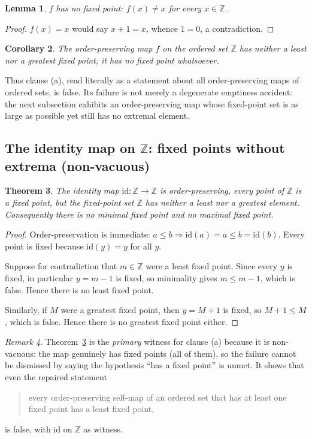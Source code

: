 \documentclass[11pt]{article}
\newtheorem{theorem}{Theorem}
\newtheorem{lemma}[theorem]{Lemma}
\newtheorem{corollary}[theorem]{Corollary}
\theoremstyle{definition}
\theoremstyle{remark}
\newtheorem{remark}[theorem]{Remark}
\newcommand{\Z}{\mathbb{Z}}
\newcommand{\id}{\mathrm{id}}
\begin{document}
\begin{lemma}\label{lem:ffixfree}
$f$ has no fixed point: $f(x)\neq x$ for every $x\in\Z$.
\end{lemma}

\begin{proof}
$f(x)=x$ would say $x+1=x$, whence $1=0$, a contradiction.
\end{proof}

\begin{corollary}\label{cor:shift}
The order-preserving map $f$ on the ordered set $\Z$ has neither a least nor a
greatest fixed point; it has no fixed point whatsoever.
\end{corollary}

Thus clause (a), read literally as a statement about all order-preserving maps
of ordered sets, is false. Its failure is not merely a degenerate emptiness
accident: the next subsection exhibits an order-preserving map whose
fixed-point set is as large as possible yet still has no extremal element.

\subsection{The identity map on $\Z$: fixed points without extrema (non-vacuous)}

\begin{theorem}\label{thm:id}
The identity map $\id:\Z\to\Z$ is order-preserving, every point of $\Z$ is a
fixed point, but the fixed-point set $\Z$ has neither a least nor a greatest
element. Consequently there is no minimal fixed point and no maximal fixed
point.
\end{theorem}

\begin{proof}
Order-preservation is immediate: $a\le b\Rightarrow \id(a)=a\le b=\id(b)$.
Every point is fixed because $\id(y)=y$ for all $y$.

Suppose for contradiction that $m\in\Z$ were a least fixed point. Since every
$y$ is fixed, in particular $y=m-1$ is fixed, so minimality gives $m\le m-1$,
which is false. Hence there is no least fixed point.

Similarly, if $M$ were a greatest fixed point, then $y=M+1$ is fixed, so
$M+1\le M$, which is false. Hence there is no greatest fixed point either.
\end{proof}

\begin{remark}
Theorem~\ref{thm:id} is the \emph{primary} witness for clause (a) because it is
non-vacuous: the map genuinely has fixed points (all of them), so the failure
cannot be dismissed by saying the hypothesis ``has a fixed point'' is unmet. It
shows that even the repaired statement

\begin{quote}
every order-preserving self-map of an ordered set that has at least one fixed
point has a least fixed point,
\end{quote}

is false, with $\id$ on $\Z$ as witness.
\end{remark}
\end{document}
